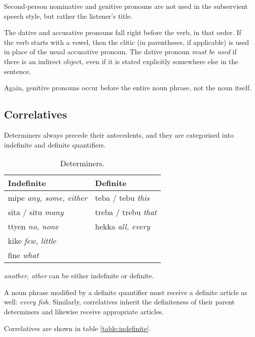 \documentclass{book}
\begin{document}
Second-person nominative and genitive pronouns are not used in the subservient speech style, but rather the listener's title.

The dative and accusative pronouns fall right before the verb, in that order. If the verb starts with a vowel, then the clitic (in parentheses, if applicable) is used in place of the usual accusative pronoun. The dative pronoun \emph{must be used} if there is an indirect object, even if it is stated explicitly somewhere else in the sentence.

Again, genitive pronouns occur before the entire noun phrase, not the noun itself.

\subsection{Correlatives}

Determiners always precede their antecedents, and they are categorised into indefinite and definite quantifiers.

\begin{table}[ht]
  \caption{Determiners.}
  \centering
  \begin{tabular}{l|l}
    Indefinite & Definite \\
    \hline
    mipe \emph{any, some, either} & teba / tebu \emph{this} \\
    sita / situ \emph{many} & treba / trebu \emph{that} \\
    ttyen \emph{no, none} & hekka \emph{all, every} \\
    kike \emph{few, little} & \\
    fine \emph{what} & \\
  \end{tabular}
\end{table}

 \emph{another, other} can be either indefinite or definite.

A noun phrase modified by a definite quantifier must receive a definite article as well:  \emph{every fish}. Similarly, correlatives inherit the definiteness of their parent determiners and likewise receive appropriate articles.

Correlatives are shown in table \ref{table:indefinite}.
\end{document}
